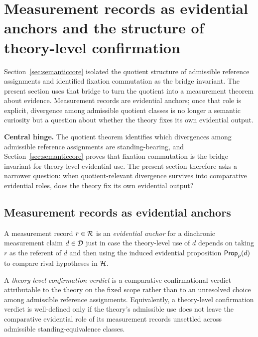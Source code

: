 \section{Measurement records as evidential anchors and the structure of theory-level confirmation}
\label{sec:confirmation}

Section~\ref{sec:semanticcore} isolated the quotient structure of admissible reference assignments and
identified fixation commutation as the bridge invariant. The present section uses that bridge to turn the
quotient into a measurement theorem about evidence. Measurement records are evidential anchors; once
that role is explicit, divergence among admissible quotient classes is no longer a semantic curiosity but
a question about whether the theory fixes its own evidential output.

\begin{claimbox}
\textbf{Central hinge.} The quotient theorem identifies which divergences among admissible reference
assignments are standing-bearing, and Section~\ref{sec:semanticcore} proves that fixation commutation
is the bridge invariant for theory-level evidential use. The present section therefore asks a narrower
question: when quotient-relevant divergence survives into comparative evidential roles, does the theory
fix its own evidential output?
\end{claimbox}

\subsection{Measurement records as evidential anchors}

\begin{definition}
A measurement record $r\in\mathcal{R}$ is an \emph{evidential anchor} for a diachronic measurement claim
$d\in\mathcal{D}$ just in case the theory-level use of $d$ depends on taking $r$ as the referent of $d$ and
then using the induced evidential proposition $\mathsf{Prop}_\rho(d)$ to compare rival hypotheses in
$\mathcal{H}$.
\end{definition}

\begin{definition}
\label{def:theory-level-confirmation}
A \emph{theory-level confirmation verdict} is a comparative confirmational verdict attributable to the
theory on the fixed scope rather than to an unresolved choice among admissible reference
assignments. Equivalently, a theory-level confirmation verdict is well-defined only if the theory's
admissible use does not leave the comparative evidential role of its measurement records unsettled
across admissible standing-equivalence classes.
\end{definition}

